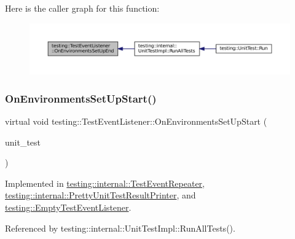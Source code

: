 Here is the caller graph for this function\+:
\nopagebreak
\begin{figure}[H]
\begin{center}
\leavevmode
\includegraphics[width=350pt]{classtesting_1_1TestEventListener_aaa1021d75f5dbf3f05c829c1cc520341_icgraph}
\end{center}
\end{figure}
\mbox{\label{classtesting_1_1TestEventListener_aa6502e534919605be45f26a6daf9a40c}} 
\subsubsection{\texorpdfstring{On\+Environments\+Set\+Up\+Start()}{OnEnvironmentsSetUpStart()}}
{\footnotesize\ttfamily virtual void testing\+::\+Test\+Event\+Listener\+::\+On\+Environments\+Set\+Up\+Start (\begin{DoxyParamCaption}\item[{const \hyperlink{classtesting_1_1UnitTest}{Unit\+Test} \&}]{unit\+\_\+test }\end{DoxyParamCaption})\hspace{0.3cm}{\ttfamily [pure virtual]}}



Implemented in \hyperlink{classtesting_1_1internal_1_1TestEventRepeater_ae71819925adec0471fa7abc5072b8244}{testing\+::internal\+::\+Test\+Event\+Repeater}, \hyperlink{classtesting_1_1internal_1_1PrettyUnitTestResultPrinter_a846a5e82b421e04fcdd2b1b2b64b162f}{testing\+::internal\+::\+Pretty\+Unit\+Test\+Result\+Printer}, and \hyperlink{classtesting_1_1EmptyTestEventListener_a156d1965248fbdced6aabacadfa2d63f}{testing\+::\+Empty\+Test\+Event\+Listener}.



Referenced by testing\+::internal\+::\+Unit\+Test\+Impl\+::\+Run\+All\+Tests().

